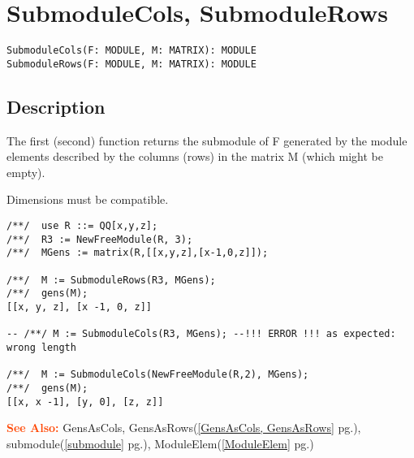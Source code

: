 \documentclass[a4paper]{mybook}
\newenvironment{command}{}{} %
\newcommand\SeeAlso{\par\textcolor{OrangeRed}{\textbf{\large See Also: }}}
\begin{document}
\section{SubmoduleCols, SubmoduleRows}
\label{SubmoduleCols, SubmoduleRows}
\begin{command} %


\begin{Verbatim}[label=syntax, rulecolor=\color{MidnightBlue},
frame=single]
SubmoduleCols(F: MODULE, M: MATRIX): MODULE
SubmoduleRows(F: MODULE, M: MATRIX): MODULE
\end{Verbatim}


\subsection*{Description}

The first (second) function returns the submodule of F generated by
the module elements described by the columns (rows) in the matrix M
(which might be empty).
\par 
Dimensions must be compatible.
\begin{Verbatim}[label=example, rulecolor=\color{PineGreen}, frame=single]
/**/  use R ::= QQ[x,y,z];
/**/  R3 := NewFreeModule(R, 3);
/**/  MGens := matrix(R,[[x,y,z],[x-1,0,z]]);

/**/  M := SubmoduleRows(R3, MGens);
/**/  gens(M);
[[x, y, z], [x -1, 0, z]]

-- /**/ M := SubmoduleCols(R3, MGens); --!!! ERROR !!! as expected: wrong length

/**/  M := SubmoduleCols(NewFreeModule(R,2), MGens);
/**/  gens(M);
[[x, x -1], [y, 0], [z, z]]
\end{Verbatim}


\SeeAlso %
  GensAsCols, GensAsRows(\ref{GensAsCols, GensAsRows} pg.\pageref{GensAsCols, GensAsRows}), 
    submodule(\ref{submodule} pg.\pageref{submodule}), 
    ModuleElem(\ref{ModuleElem} pg.\pageref{ModuleElem})
\end{command} %
\end{document}
